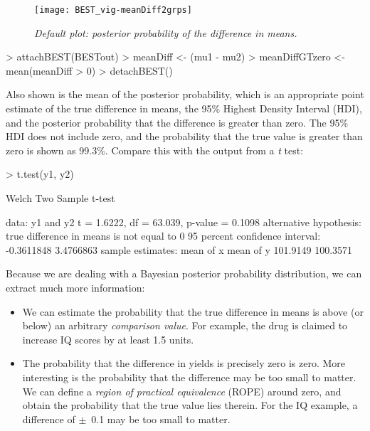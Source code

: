 \documentclass[a4paper]{article}
\begin{document}
\begin{figure}[H]
  \centering
  \texttt{[image: BEST\_vig-meanDiff2grps]}
  \caption{\it Default plot: posterior probability of the difference in means.}
  \label{fig:means2g}
\end{figure}

\begin{Schunk}
\begin{Sinput}
> attachBEST(BESTout)
> meanDiff <- (mu1 - mu2)
> meanDiffGTzero <- mean(meanDiff > 0)
> detachBEST()
\end{Sinput}
\end{Schunk}
Also shown is the mean of the posterior probability, which is an appropriate point estimate of the true difference in means, the 95\% Highest Density Interval (HDI), and the posterior probability that the difference is greater than zero. The 95\% HDI does not include zero, and the probability that the true value is greater than zero is shown as 99.3\%. Compare this with the output from a \emph{t} test:

\begin{Schunk}
\begin{Sinput}
> t.test(y1, y2)
\end{Sinput}
\begin{Soutput}
	Welch Two Sample t-test

data:  y1 and y2 
t = 1.6222, df = 63.039, p-value = 0.1098
alternative hypothesis: true difference in means is not equal to 0 
95 percent confidence interval:
 -0.3611848  3.4766863 
sample estimates:
mean of x mean of y 
 101.9149  100.3571 
\end{Soutput}
\end{Schunk}

Because we are dealing with a Bayesian posterior probability distribution, we can extract much more information:

\begin{itemize}
  \item We can estimate the probability that the true difference in means is above (or below) an arbitrary \emph{comparison value}. For example, the drug is claimed to increase IQ scores by at least 1.5 units.
  \item The probability that the difference in yields is precisely zero is zero. More interesting is the probability that the difference may be too small to matter. We can define a \emph{region of practical equivalence} (ROPE) around zero, and obtain the probability that the true value lies therein. For the IQ example, a difference of $\pm$~0.1 may be too small to matter.
\end{itemize}
\end{document}
